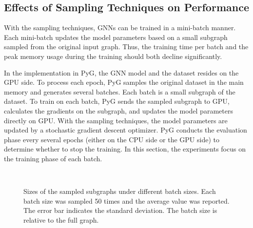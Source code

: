 \subsection{Effects of Sampling Techniques on Performance}
\label{sec:effects_of_sampling_techniques_on_performance}

With the sampling techniques, GNNs can be trained in a mini-batch manner.
Each mini-batch updates the model parameters based on a small subgraph sampled from the original input graph.
Thus, the training time per batch and the peak memory usage during the training should both decline significantly.

In the implementation in PyG, the GNN model and the dataset resides on the GPU side.
To process each epoch, PyG samples the original dataset in the main memory and generates several batches.
Each batch is a small subgraph of the dataset.
To train on each batch, PyG sends the sampled subgraph to GPU, calculates the gradients on the subgraph, and updates the model parameters directly on GPU.
With the sampling techniques, the model parameters are updated by a stochastic gradient descent optimizer.
PyG conducts the evaluation phase every several epochs (either on the CPU side or the GPU side) to determine whether to stop the training.
In this section, the experiments focus on the training phase of each batch.

\begin{figure}[tbp]
    \centering
     \\
    \caption{Sizes of the sampled subgraphs under different batch sizes. Each batch size was sampled 50 times and the average value was reported. The error bar indicates the standard deviation. The batch size is relative to the full graph.}
    \label{fig:exp_sampling_minibatch_graph_info}
\end{figure}

